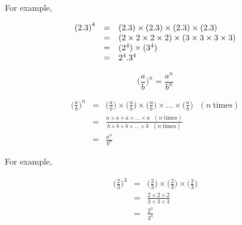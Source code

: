 For example,

\begin{equation*}
    \begin{array}{ccl}\hfill {(2  .3)}^{4}& =& (2  .3)  \times (2  .3)  \times (2  .3)  \times (2  .3)\hfill \\
	    & =& (2  \times 2  \times 2  \times 2)  \times (3  \times 3  \times 3  \times 3)\hfill \\
	    & =& ({2}^{4})  \times ({3}^{4})\hfill \\ & =& {2}^{4}.{3}^{4}\hfill 
    \end{array}
\end{equation*}




{
$$ \Big(\frac{a}{b}\Big)^n = \frac{a^n}{b^n} $$

\begin{eqnarray*}

 \Big(\frac{a}{b}\Big)^n & = & \Big(\frac{a}{b}\Big) \times \Big(\frac{a}{b}\Big) \times \Big(\frac{a}{b}\Big) \times \ldots \times \Big(\frac{a}{b}\Big) ~~~(n~\mbox{times}) \\
                         & = & \frac{a \times a \times a \times \ldots \times a ~~~(n~\mbox{times})}{b \times b \times b \times \ldots \times b ~~~(n~\mbox{times})}\\
                         & = & \frac{a^n}{b^n}
\end{eqnarray*}



}




For example,

\begin{eqnarray*}

\Big(\frac{2}{3}\Big)^3 & = & \Big(\frac{2}{3}\Big) \times  \Big(\frac{2}{3}\Big) \times \Big(\frac{2}{3}\Big) \\
                        & = & \frac{2 \times 2 \times 2}{3 \times 3 \times 3} \\
		        & = & \frac{2^3}{3^3}

\end{eqnarray*}


